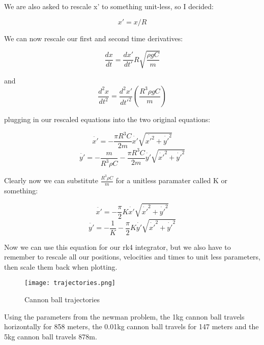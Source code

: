\documentclass{article}
\begin{document}
We are also asked to rescale x' to something unit-less, so I decided:

\begin{equation}
    x'=x/R
\end{equation}

We can now rescale our first and second time derivatives:

\begin{equation}
    \frac{dx}{dt}=\frac{dx'}{dt'}R\sqrt{\frac{\rho g C}{m}}
\end{equation}

and
\begin{equation}
    \frac{d^2x}{dt^2}=\frac{d^2x'}{dt'^2}(\frac{R^3 \rho g C}{m})
\end{equation}


plugging in our rescaled equations into the two original equations:

\begin{equation}
    \ddot{x'}=-\frac{\pi R^3 C}{2m}\dot{x'}\sqrt{\dot{x'^2}+\dot{y'}^2}
\end{equation}
\begin{equation}
    \ddot{y'}=-\frac{m}{R^3 \rho C}-\frac{\pi R^3 C}{2m}\dot{y'}\sqrt{\dot{x'}^2+\dot{y'}^2}
\end{equation}

Clearly now we can substitute $\frac{R^3 \rho C}{m}$ for a  unitless paramater called K or something:

\begin{equation}
    \ddot{x'}=-\frac{\pi}{2}K\dot{x'}\sqrt{\dot{x'}^2+\dot{y'}^2}
\end{equation}
\begin{equation}
    \ddot{y'}=-\frac{1}{K}-\frac{\pi}{2}K\dot{y'}\sqrt{\dot{x'}^2+\dot{y'}^2}
\end{equation}


Now we can use this equation for our rk4 integrator, but we also have to remember to rescale all our positions, velocities and times to unit less parameters, then scale them back when plotting. 

\begin{figure}
    \centering
    \texttt{[image: trajectories.png]}
    \caption{Cannon ball trajectories}
    \label{fig:enter-label}
\end{figure}
Using the parameters from the newman problem, the 1kg cannon ball travels horizontally for 858 meters, the 0.01kg cannon ball travels for 147 meters and the 5kg cannon ball travels 878m.
\end{document}
